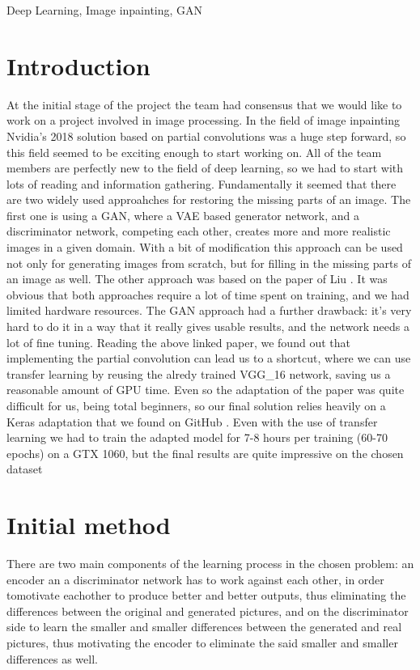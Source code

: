 \documentclass[conference]{IEEEtran}
\begin{document}
\begin{IEEEkeywords}
Deep Learning, Image inpainting, GAN
\end{IEEEkeywords}

\section{Introduction}
At the initial stage of the project the team had consensus that we would like to work on a project involved in image processing. In the field of image inpainting Nvidia’s 2018 solution based on partial convolutions was a huge step forward, so this field seemed to be exciting enough to start working on. All of the team members are perfectly new to the field of deep learning, so we had to start with lots of reading and information gathering. Fundamentally it seemed that there are two widely used approahches for restoring the missing parts of an image. The first one is using a GAN, where a VAE based generator network, and a discriminator network, competing each other, creates more and more realistic images in a given domain. With a bit of modification this approach can be used not only for generating images from scratch, but for filling in the missing parts of an image as well. The other approach was based on the paper of Liu \cite{nvidia_paper}. It was obvious that both approaches require a lot of time spent on training, and we had limited hardware resources. The GAN approach had a further drawback: it’s very hard to do it in a way that it really gives usable results, and the network needs a lot of fine tuning. Reading the above linked paper, we found out that implementing the partial convolution can lead us to a shortcut, where we can use transfer learning by reusing the alredy trained VGG\_16 network, saving us a reasonable amount of GPU time. Even so the adaptation of the paper was quite difficult for us, being total beginners, so our final solution relies heavily on a Keras adaptation that we found on GitHub \cite{pconv_keras}. Even with the use of transfer learning we had to train the adapted model for 7-8 hours per training (60-70 epochs) on a GTX 1060, but the final results are quite impressive on the chosen dataset

\section{Initial method}
There are two main components of the learning process in the chosen problem: an encoder an a discriminator network has to work against each other, in order tomotivate eachother to produce better and better outputs, thus eliminating the differences between the original and generated pictures, and on the discriminator side to learn the  smaller and smaller differences between the generated and real pictures, thus motivating the encoder to eliminate the said smaller and smaller differences as well. 
\end{document}
